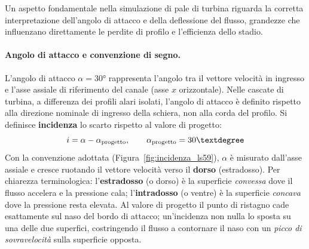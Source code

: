 Un aspetto fondamentale nella simulazione di pale di turbina riguarda la corretta
interpretazione dell'angolo di attacco e della deflessione del flusso, grandezze che
influenzano direttamente le perdite di profilo e l'efficienza dello stadio.

\paragraph{Angolo di attacco e convenzione di segno.}
L'angolo di attacco $\alpha = 30°$ rappresenta l'angolo tra il vettore velocità in ingresso
e l'asse assiale di riferimento del canale (asse $x$ orizzontale). Nelle cascate di turbina, a
differenza dei profili alari isolati, l'angolo di attacco è definito rispetto alla direzione
nominale di ingresso della schiera, non alla corda del profilo. Si definisce
\textbf{incidenza} lo scarto rispetto al valore di progetto:
\begin{equation}
  i = \alpha - \alpha_{\rm progetto}, \qquad \alpha_{\rm progetto} = 30°
\end{equation}
Con la convenzione adottata (Figura~\ref{fig:incidenza_ls59}), $\alpha$ è misurato dall'asse
assiale e cresce ruotando il vettore velocità verso il \textbf{dorso} (estradosso). Per
chiarezza terminologica: l'\textbf{estradosso} (o dorso) è la superficie \emph{convessa} dove
il flusso accelera e la pressione cala; l'\textbf{intradosso} (o ventre) è la superficie
\emph{concava} dove la pressione resta elevata. Al valore di progetto il punto di ristagno cade
esattamente sul naso del bordo di attacco; un'incidenza non nulla lo sposta su una delle due
superfici, costringendo il flusso a contornare il naso con un \emph{picco di sovravelocità}
sulla superficie opposta.

